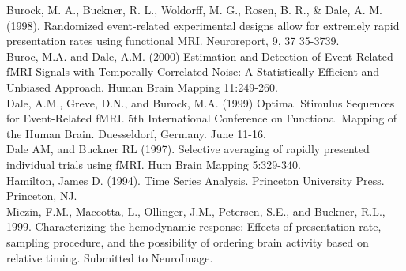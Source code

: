 \documentclass[10pt]{article}
\begin{document}
\indent Burock, M. A., Buckner, R. L., Woldorff, M. G., Rosen, B. R.,
\& Dale, A. M. (1998). Randomized event-related experimental designs
allow for extremely rapid presentation rates using functional MRI.
Neuroreport, 9, 37 35-3739.\\

\indent Buroc, M.A. and Dale, A.M. (2000) Estimation and Detection of
Event-Related fMRI Signals with Temporally Correlated Noise: A
Statistically Efficient and Unbiased Approach. Human Brain Mapping
11:249-260.\\

\indent Dale, A.M., Greve, D.N., and Burock, M.A. (1999) Optimal Stimulus
Sequences for Event-Related fMRI.  5th International Conference on
Functional Mapping of the Human Brain. Duesseldorf, Germany. June
11-16. \\

\indent Dale AM, and Buckner RL (1997). Selective averaging of rapidly
presented individual trials using fMRI. Hum Brain Mapping 5:329-340.\\

\indent Hamilton, James D. (1994).  Time Series Analysis. Princeton
University Press. Princeton, NJ.\\

\indent Miezin, F.M., Maccotta, L., Ollinger, J.M., Petersen, S.E.,
and Buckner, R.L., 1999. Characterizing the hemodynamic response:
Effects of presentation rate, sampling procedure, and the possibility
of ordering brain activity based on relative timing. Submitted to
NeuroImage.\\
\end{document}
